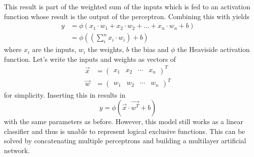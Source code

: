 This result is part of the weighted sum of the inputs which is fed to an activation function whose result is the output of the perceptron.
Combining this with  yields
\begin{align}
	\label{eq:perceptron-sum}
	y &= \phi \left( x_1 \cdot w_1 + x_2 \cdot w_2 + \ldots + x_n \cdot w_n + b \right)\\
	  &= \phi \left( \left( \sum_{i}^{n} x_i \cdot w_i \right) + b \right)
\end{align}
where $x_i$ are the inputs, $w_i$ the weights, $b$ the bias and $\phi$ the Heaviside activation function.
Let's write the inputs and weights as vectors of
\begin{align}
	\vec{x} &= \begin{pmatrix} x_1 & x_2 & \cdots & x_n \end{pmatrix}^T \\
	\vec{w} &= \begin{pmatrix} w_1 & w_2 & \cdots & w_n \end{pmatrix}^T 
\end{align}
for simplicity.
Inserting this in  results in
\begin{equation}
	y = \phi \left( \vec{x} \cdot \vec{w^T} + b \right)
\end{equation}
with the same parameters as before.
However, this model still works as a linear classifier and thus is unable to represent logical exclusive functions.
This can be solved by concatenating multiple perceptrons and building a multilayer artificial network.
